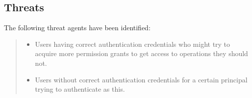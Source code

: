\documentclass[10pt,a4paper,english]{article}
\begin{document}

\hypertarget{threats}{}
\subsection*{Threats}

The following threat agents have been identified:
\begin{quote}
\begin{itemize}
\item {} 
Users having correct authentication credentials who might try to
acquire more permission grants to get access to operations they
should not.

\item {} 
Users without correct authentication credentials for a certain
principal trying to authenticate as this.

\end{itemize}
\end{quote}
\end{document}
